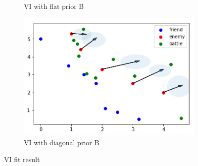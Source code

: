 \documentclass{article}
\begin{document}
\begin{figure}[h]
\begin{subfigure}[b]{0.45\linewidth}
    \caption{VI with flat prior B}
  \end{subfigure}
  \begin{subfigure}[b]{0.45\linewidth}
    \includegraphics[width=\linewidth]{VI22.png}
    \caption{VI with diagonal prior B}
  \end{subfigure}
  \caption{VI fit result}
  \label{fig:VI}
\end{figure}
\end{document}
